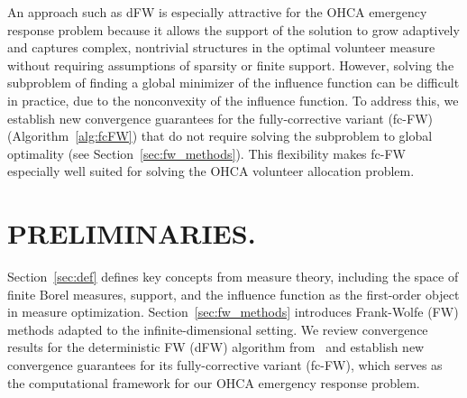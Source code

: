 \documentclass[stsy,sglanonrev]{informs4}
\begin{document}
An approach such as dFW is especially attractive for the OHCA emergency response problem because it allows the support of the solution to grow adaptively and captures complex, nontrivial structures in the optimal volunteer measure without requiring assumptions of sparsity or finite support. However, solving the subproblem of finding a global minimizer of the influence function can be difficult in practice, due to the nonconvexity of the influence function. To address this, we establish new convergence guarantees for the fully-corrective variant (fc-FW) (Algorithm~\ref{alg:fcFW}) that do not require solving the subproblem to global optimality (see Section~\ref{sec:fw_methods}). This flexibility makes fc-FW especially well suited for solving the OHCA volunteer allocation problem.

\section{PRELIMINARIES.}\label{sec:preliminaries}
Section~\ref{sec:def} defines key concepts from measure theory, including the space of finite Borel measures, support, and the influence function as the first-order object in measure optimization. Section~\ref{sec:fw_methods} introduces Frank-Wolfe (FW) methods adapted to the infinite-dimensional setting. We review convergence results for the deterministic FW (dFW) algorithm from~\cite{yu2024det} and establish new convergence guarantees for its fully-corrective variant (fc-FW), which serves as the computational framework for our OHCA emergency response problem.
\end{document}
